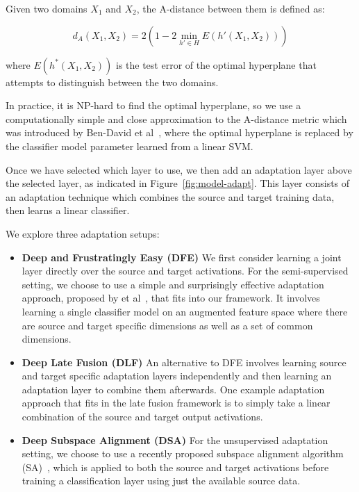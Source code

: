 Given two domains $X_1$ and $X_2$, the A-distance between them is defined as:

\begin{equation}
  d_A(X_1, X_2) = 2 \left( 1 - 2 \min_{h' \in H} E(h'(X_1, X_2))\right)
\end{equation}


where $E(h^*(X_1, X_2))$ is the test error of the optimal hyperplane that attempts to
distinguish between the two domains.

In practice, it is NP-hard to find the optimal hyperplane, so we use a computationally simple and 
close approximation to the A-distance metric which was introduced by Ben-David et al~\cite{adist-comp}, 
where the optimal hyperplane is replaced by the classifier model parameter learned from a linear SVM.

Once we have selected which layer to use, we then add an adaptation layer above
the selected layer, as indicated in Figure~\ref{fig:model-adapt}. This layer
consists of an adaptation technique which combines the source and target
training data, then learns a linear classifier.

We explore three adaptation setups:
\begin{itemize}
  \item \textbf{Deep and Frustratingly Easy (DFE)}
    We first consider learning a joint layer directly over the source and target
    activations. For the semi-supervised setting, we choose to use a simple and
    surprisingly effective adaptation approach, proposed by \daume
    et al~\cite{daume}, that fits into our framework. It involves learning a
    single classifier model on an augmented feature space where there are source
    and target specific dimensions as well as a set of common dimensions.

  \item \textbf{Deep Late Fusion (DLF)}
    An alternative to DFE involves learning source and target specific
    adaptation layers independently and then learning an adaptation layer to
    combine them afterwards. One example adaptation approach that fits in the
    late fusion framework is to simply take a linear combination of the source
    and target output activations.

  \item \textbf{Deep Subspace Alignment (DSA)}
    For the unsupervised adaptation setting, we choose to use a recently
    proposed subspace alignment algorithm (SA)~\cite{sa}, which is applied to
    both the source and target activations before training a classification
    layer using just the available source data.

\end{itemize}

